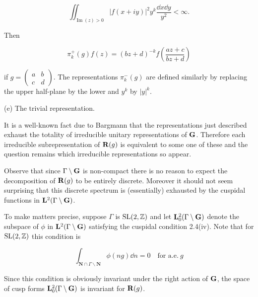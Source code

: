 \begin{equation}\label{eq:2.20}
\iint_{\operatorname{Im}(z) > 0} |f(x + iy)|^2 y^k \frac{\dd x \dd y}{y^2} < \infty.\tag{2.20}
\end{equation}

Then

\begin{equation}\label{eq:2.21}
\pi_k^{+}(g) f(z) = (bz + d)^{-k} f\left(\frac{az + c}{bz + d}\right)\tag{2.21}
\end{equation}

if $g = \begin{pmatrix} a & b \\ c & d \end{pmatrix}$. The representations $\pi_k^{-}(g)$ are defined similarly by replacing the upper half-plane by the lower and $y^k$ by $|y|^k$.

(e) The trivial representation.

It is a well-known fact due to Bargmann that the representations just described exhaust the totality of irreducible unitary representations of $\mathbf{G}$. Therefore each irreducible subrepresentation of $\mathbf{R}(g)$ is equivalent to some one of these and the question remains which irreducible representations so appear.

Observe that since $\Gamma \setminus \mathbf{G}$ is non-compact there is no reason to expect the decomposition of $\mathbf{R}(g)$ to be entirely discrete. Moreover it should not seem surprising that this discrete spectrum is (essentially) exhausted by the cuspidal functions in $\mathbf{L}^2(\Gamma \setminus \mathbf{G})$.

To make matters precise, suppose $\Gamma$ is $\operatorname{SL}(2,\mathbb{Z})$ and let $\mathbf{L}_0^2(\Gamma \setminus \mathbf{G})$ denote the subspace of $\phi$ in $\mathbf{L}^2(\Gamma \setminus \mathbf{G})$ satisfying the cuspidal condition 2.4(iv). Note that for $\operatorname{SL}(2,\mathbb{Z})$ this condition is

\[
\int_{\mathbf{N} \cap \Gamma \backslash \mathbf{N}} \phi(ng) \dd n = 0 \quad \text{for a.e.}\ g
\]

Since this condition is obviously invariant under the right action of $\mathbf{G}$, the space of cusp forms $\mathbf{L}_0^2(\Gamma \setminus \mathbf{G})$ is invariant for $\mathbf{R}(g)$.

